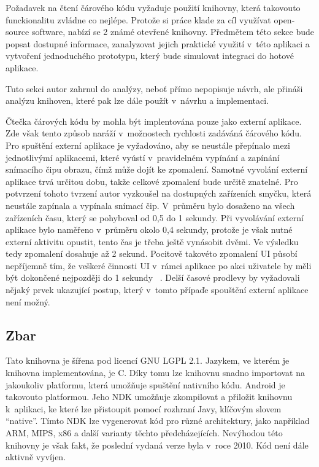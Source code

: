 \documentclass[thesis=B,czech]{FITthesis}[2013/10/20]
\begin{document}
Požadavek na čtení čárového kódu vyžaduje použití knihovny, která takovouto funckionalitu zvládne co nejlépe. Protože si práce klade za cíl využívat open-source software, nabízí se 2 známé otevřené knihovny. Předmětem této sekce bude popsat dostupné informace, zanalyzovat jejich praktické využití v~této aplikaci a vytvoření jednoduchého prototypu, který bude simulovat integraci do hotové aplikace.

Tuto sekci autor zahrnul do analýzy, neboť přímo nepopisuje návrh, ale přináši analýzu knihoven, které pak lze dále použít v~návrhu a implementaci.

Čtečka čárových kódu by mohla být implentována pouze jako externí aplikace. Zde však tento způsob naráží v~možnostech rychlosti zadáváná čárového kódu. Pro spuštění externí aplikace je vyžadováno, aby se neustále přepínalo mezi jednotlivýmí aplikacemi, které vyústí v~pravidelném vypínání a zapínání snímacího čipu obrazu, čímž může dojít ke zpomalení. Samotné vyvolání externí aplikace trvá určitou dobu, takže celkové zpomalení bude určitě znatelné. Pro potvrzení tohoto tvrzení autor vyzkoušel na dostupných zařízeních smyčku, která neustále zapínala a vypínala snímací čip. V~průměru bylo dosaženo na všech zařízeních času, který se pohyboval od 0,5 do 1 sekundy. Při vyvolávání externí aplikace bylo naměřeno v~průměru okolo 0,4 sekundy, protože je však nutné externí aktivitu opustit,  tento čas je třeba ještě vynásobit dvěmi. Ve výsledku tedy zpomalení dosahuje až 2 sekund. Pocitově takovéto zpomalení UI působí nepříjemně tím, že veškeré činnosti UI v~rámci aplikace po akci uživatele by měli být dokončené nejpozději do 1 sekundy ~\cite{ui_maxlag}. Delší časové prodlevy by vyžadovali nějaký prvek ukazující postup, který v~tomto přípaďe spouštění externí aplikace není možný.

\subsection{Zbar ~\cite{zbar}}

Tato knihovna je šířena pod licencí GNU LGPL 2.1. Jazykem, ve kterém je knihovna implementována, je C. Díky tomu lze knihovnu snadno importovat na jakoukoliv platformu, která umožňuje spuštění nativního kódu. Android je takovouto platformou. Jeho NDK umožňuje zkompilovat a přiložit knihovnu k~aplikaci, ke které lze přistoupit pomocí rozhraní Javy, klíčovým slovem ``native''. Tímto NDK lze vygenerovat kód pro různé architektury, jako například ARM, MIPS, x86 a další varianty těchto předcházejících. Nevýhodou této knihovny je však fakt, že poslední vydaná verze byla v~roce 2010. Kód není dále aktivně vyvíjen.
\end{document}
